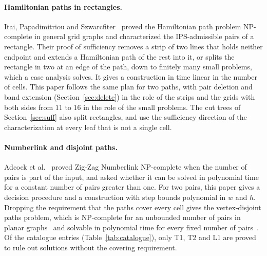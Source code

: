 \documentclass[11pt]{article}
\newcommand{\ent}[1]{\textsf{#1}}
\begin{document}
\paragraph{Hamiltonian paths in rectangles.} Itai, Papadimitriou and Szwarcfiter~\cite{ips82}
proved the Hamiltonian path problem NP-complete in general grid graphs and characterized the
IPS-admissible pairs of a rectangle. Their proof of sufficiency removes a strip of two lines that
holds neither endpoint and extends a Hamiltonian path of the rest into it, or splits the rectangle
in two at an edge of the path, down to finitely many small problems, which a case analysis solves.
It gives a construction in time linear in the number of cells. This paper follows the same plan for
two paths, with pair deletion and band extension (Section~\ref{sec:delete}) in the role of the
strips and the grids with both sides from $11$ to $16$ in the role of the small problems. The cut
trees of Section~\ref{sec:suff} also split rectangles, and use the sufficiency direction of the
characterization at every leaf that is not a single cell.

\paragraph{Numberlink and disjoint paths.} Adcock et al.~\cite{adcock15} proved Zig-Zag Numberlink
NP-complete when the number of pairs is part of the input, and asked whether it can be solved in
polynomial time for a constant number of pairs greater than one. For two pairs, this paper gives a
decision procedure and a construction with step bounds polynomial in $w$ and $h$.
Dropping the requirement that the paths cover every cell gives the vertex-disjoint paths problem,
which is NP-complete for an unbounded number of pairs in planar graphs~\cite{lynch75} and solvable
in polynomial time for every fixed number of pairs~\cite{rs95}.
Of the catalogue entries (Table~\ref{tab:catalogue}), only \ent{T1}, \ent{T2} and \ent{L1} are
proved to rule out solutions without the covering requirement.
\end{document}
